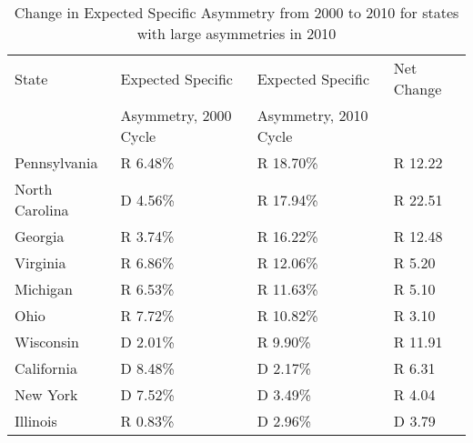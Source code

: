 \begin{table}[htb!]
\centering
\caption{Change in Expected Specific Asymmetry from 2000 to 2010 for states with large asymmetries in 2010 \label{tab:Asym2000to2010}}
\begin{tabular}{|l|l|l|l|}
\hline
State & Expected Specific     & Expected Specific & Net Change\\
      & Asymmetry, 2000 Cycle & Asymmetry, 2010 Cycle & \\
\hline
\hline
Pennsylvania & R 6.48\% & R 18.70\% & R 12.22\\
\hline
North Carolina & D 4.56\% & R 17.94\% & R 22.51\\
\hline
Georgia & R 3.74\% & R 16.22\% & R 12.48\\
\hline
Virginia & R 6.86\% & R 12.06\% & R 5.20\\
\hline
Michigan & R 6.53\% & R 11.63\% & R 5.10\\
\hline
Ohio & R 7.72\% & R 10.82\% & R 3.10\\
\hline
Wisconsin & D 2.01\% & R 9.90\% & R 11.91\\
\hline
California & D 8.48\% & D 2.17\% & R 6.31\\
\hline
New York & D 7.52\% & D 3.49\% & R 4.04\\
\hline
Illinois & R 0.83\% & D 2.96\% & D 3.79\\
\hline
\end{tabular}
\end{table}
